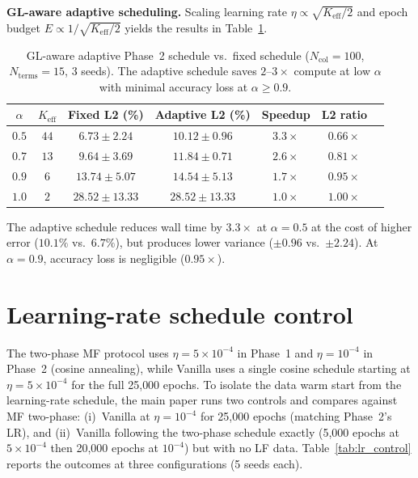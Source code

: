\documentclass[11pt]{article}
\newcommand{\Ncol}{N_{\mathrm{col}}}
\begin{document}
\textbf{GL-aware adaptive scheduling.} Scaling learning rate $\eta \propto \sqrt{K_{\mathrm{eff}}/2}$ and epoch budget $E \propto 1/\sqrt{K_{\mathrm{eff}}/2}$ yields the results in Table~\ref{tab:adaptive_phase2}.

\begin{table}[t]
\centering
\caption{GL-aware adaptive Phase~2 schedule vs.\ fixed schedule ($\Ncol = 100$, $N_{\mathrm{terms}} = 15$, 3 seeds). The adaptive schedule saves $2$--$3\times$ compute at low $\alpha$ with minimal accuracy loss at $\alpha \geq 0.9$.}
\label{tab:adaptive_phase2}
\begin{tabular}{ccccccc}
\toprule
$\alpha$ & $K_{\mathrm{eff}}$ & Fixed L2 (\%) & Adaptive L2 (\%) & Speedup & L2 ratio \\
\midrule
$0.5$ & $44$ & $6.73 \pm 2.24$ & $10.12 \pm 0.96$ & $3.3\times$ & $0.66\times$ \\
$0.7$ & $13$ & $9.64 \pm 3.69$ & $11.84 \pm 0.71$ & $2.6\times$ & $0.81\times$ \\
$0.9$ & $6$  & $13.74 \pm 5.07$ & $14.54 \pm 5.13$ & $1.7\times$ & $0.95\times$ \\
$1.0$ & $2$  & $28.52 \pm 13.33$ & $28.52 \pm 13.33$ & $1.0\times$ & $1.00\times$ \\
\bottomrule
\end{tabular}
\end{table}

The adaptive schedule reduces wall time by $3.3\times$ at $\alpha = 0.5$ at the cost of higher error ($10.1\%$ vs.\ $6.7\%$), but produces lower variance ($\pm 0.96$ vs.\ $\pm 2.24$). At $\alpha = 0.9$, accuracy loss is negligible ($0.95\times$).

\section{Learning-rate schedule control}
\label{sec:lr_control_supp}

The two-phase MF protocol uses $\eta = 5 \times 10^{-4}$ in Phase~1 and $\eta = 10^{-4}$ in Phase~2 (cosine annealing), while Vanilla uses a single cosine schedule starting at $\eta = 5 \times 10^{-4}$ for the full 25{,}000 epochs. To isolate the data warm start from the learning-rate schedule, the main paper runs two controls and compares against MF two-phase: (i)~Vanilla at $\eta = 10^{-4}$ for 25{,}000 epochs (matching Phase~2's LR), and (ii)~Vanilla following the two-phase schedule exactly (5{,}000 epochs at $5 \times 10^{-4}$ then 20{,}000 epochs at $10^{-4}$) but with no LF data. Table~\ref{tab:lr_control} reports the outcomes at three configurations (5 seeds each).
\end{document}
